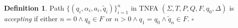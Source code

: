 \documentclass{article}
\newcommand{\Xin}{\!\in\!}
\newcommand{\Xeq}{\!=\!}
\newcommand{\Xmap}{\!\mapsto\!}
\newcommand{\XB}{\mathcal{B}}
\newcommand{\XS}{\mathcal{S}}
\newcommand{\XT}{\mathcal{T}}
\newcommand*{\Xbar}[1]{\overline{#1\vphantom{\bar{#1}}}}
\theoremstyle{definition}
\newtheorem{Xdef}{Definition}
\begin{document}
\begin{multicols}{2}
    \begin{Xdef}
    Path $\{(q_i, \alpha_i, a_i, \widetilde{q}_i)\}_{i=1}^n$ in TNFA $(\Sigma, T, P, Q, F, q_0, \Delta)$ is \emph{accepting}
    if either $n \Xeq 0 \wedge q_0 \Xin F$ or $n\!>\!0 \wedge q_1 \Xeq q_0 \wedge \widetilde{q}_n \Xin F$.
    $\square$
    \end{Xdef}

%


\end{multicols}
\end{document}
